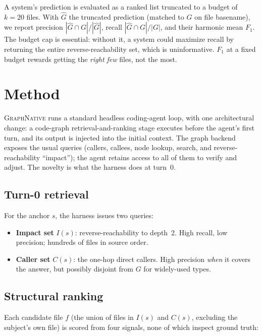 \documentclass[11pt,twocolumn]{article}
\newcommand{\sys}{{\normalfont\scshape GraphNative}}
\begin{document}
A system's prediction is evaluated as a ranked list truncated to a budget of $k=20$ files. With
$\hat{G}$ the truncated prediction (matched to $G$ on file basename), we report precision
$|\hat G\cap G|/|\hat G|$, recall $|\hat G\cap G|/|G|$, and their harmonic mean $F_1$. The budget
cap is essential: without it, a system could maximize recall by returning the entire
reverse-reachability set, which is uninformative. $F_1$ at a fixed budget rewards getting the
\emph{right few} files, not the most.

\section{Method}\label{sec:method}

\sys{} runs a standard headless coding-agent loop, with one architectural change: a code-graph
retrieval-and-ranking stage executes before the agent's first turn, and its output is injected
into the initial context. The graph backend exposes the usual queries (callers, callees, node
lookup, search, and reverse-reachability ``impact''); the agent retains access to all of them to
verify and adjust. The novelty is what the harness does at turn~0.

\subsection{Turn-0 retrieval}
For the anchor $s$, the harness issues two queries:
\begin{itemize}
  \item \textbf{Impact set} $I(s)$: reverse-reachability to depth~2. High recall, low precision;
  hundreds of files in source order.
  \item \textbf{Caller set} $C(s)$: the one-hop direct callers. High precision \emph{when} it
  covers the answer, but possibly disjoint from $G$ for widely-used types.
\end{itemize}

\subsection{Structural ranking}\label{sec:ranking}
Each candidate file $f$ (the union of files in $I(s)$ and $C(s)$, excluding the subject's own
file) is scored from four signals, none of which inspect ground truth:
\end{document}

